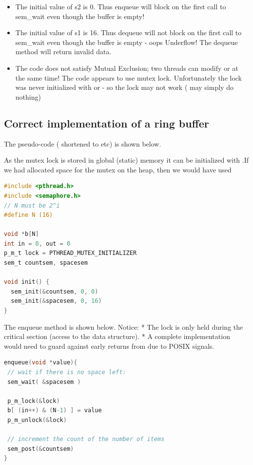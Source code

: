 \begin{itemize}
\tightlist
\item
  The initial value of s2 is 0. Thus enqueue will block on the first call to sem\_wait even though the buffer is empty!
\item
  The initial value of s1 is 16. Thus dequeue will not block on the first call to sem\_wait even though the buffer is empty - oops Underflow! The dequeue method will return invalid data.
\item
  The code does not satisfy Mutual Exclusion; two threads can modify  or  at the same time! The code appears to use mutex lock. Unfortunately the lock was never initialized with  or  - so the lock may not work ( may simply do nothing)
\end{itemize}

\subsection{Correct implementation of a ring buffer}\label{correct-implementation-of-a-ring-buffer}

The pseudo-code ( shortened to  etc) is shown below.

As the mutex lock is stored in global (static) memory it can be initialized with .If we had allocated space for the mutex on the heap, then we would have used 

\begin{lstlisting}[language=C]
#include <pthread.h>
#include <semaphore.h>
// N must be 2^i
#define N (16)

void *b[N]
int in = 0, out = 0
p_m_t lock = PTHREAD_MUTEX_INITIALIZER
sem_t countsem, spacesem

void init() {
  sem_init(&countsem, 0, 0)
  sem_init(&spacesem, 0, 16)
}
\end{lstlisting}

The enqueue method is shown below. Notice: * The lock is only held during the critical section (access to the data structure). * A complete implementation would need to guard against early returns from  due to POSIX signals.

\begin{lstlisting}[language=C]
enqueue(void *value){
 // wait if there is no space left:
 sem_wait( &spacesem )

 p_m_lock(&lock)
 b[ (in++) & (N-1) ] = value
 p_m_unlock(&lock)

 // increment the count of the number of items
 sem_post(&countsem)
}
\end{lstlisting}

